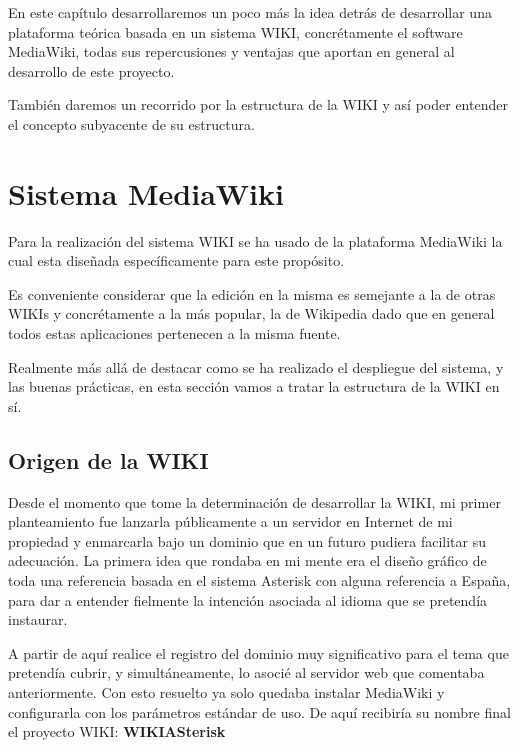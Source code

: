 
En este capítulo desarrollaremos un poco más la idea detrás de desarrollar una plataforma teórica basada en un sistema WIKI, concrétamente el software MediaWiki, todas sus repercusiones y ventajas que aportan en general al desarrollo de este proyecto.

También daremos un recorrido por la estructura de la WIKI \cite{website:wiki} y así poder entender el concepto subyacente de su estructura.

\section{Sistema MediaWiki}

Para la realización del sistema WIKI se ha usado de la plataforma MediaWiki \cite{website:mediawiki} la cual esta diseñada específicamente para este propósito.

Es conveniente considerar que la edición en la misma es semejante a la de otras WIKIs y concrétamente a la más popular, la de Wikipedia dado que en general todos estas aplicaciones pertenecen a la misma fuente.

Realmente más allá de destacar como se ha realizado el despliegue del sistema, y las buenas prácticas, en esta sección vamos a tratar la estructura de la WIKI en sí.

\subsection{Origen de la WIKI}

Desde el momento que tome la determinación de desarrollar la WIKI, mi primer planteamiento fue lanzarla públicamente a un servidor en Internet de mi propiedad y enmarcarla bajo un dominio que en un futuro pudiera facilitar su adecuación. La primera idea que rondaba en mi mente era el diseño gráfico de toda una referencia basada en el sistema Asterisk con alguna referencia a España, para dar a entender fielmente la intención asociada al idioma que se pretendía instaurar.

A partir de aquí realice el registro del dominio \cite{website:wikiasterisk} muy significativo para el tema que pretendía cubrir, y simultáneamente, lo asocié al servidor web que comentaba anteriormente. Con esto resuelto ya solo quedaba instalar MediaWiki y configurarla con los parámetros estándar de uso. De aquí recibiría su nombre final el proyecto WIKI: \textbf{WIKIASterisk}

